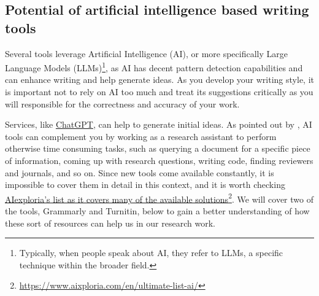 \subsection{Potential of artificial intelligence based writing tools}

Several tools leverage Artificial Intelligence (AI), or more specifically Large Language Models (LLMs)\footnote{Typically, when people speak about AI, they refer to LLMs, a specific technique within the broader field.}, as AI has decent pattern detection capabilities and can enhance writing and help generate ideas.
As you develop your writing style, it is important not to rely on AI too much and treat its suggestions critically as you will responsible for the correctness and accuracy of your work.

Services, like \href{https://chatgpt.com/}{ChatGPT}, can help to generate initial ideas.
As pointed out by \citet{lemireLargeLanguage}, AI tools can complement you by working as a research assistant to perform otherwise time consuming tasks, such as querying a document for a specific piece of information, coming up with research questions, writing code, finding reviewers and journals, and so on.
Since new tools come available constantly, it is impossible to cover them in detail in this context, and it is worth checking \href{https://www.aixploria.com/en/ultimate-list-ai/}{AIexploria's list as it covers many of the available solutions}\footnote{\url{https://www.aixploria.com/en/ultimate-list-ai/}}.
We will cover two of the tools, Grammarly and Turnitin, below to gain a better understanding of how these sort of resources can help us in our research work.



